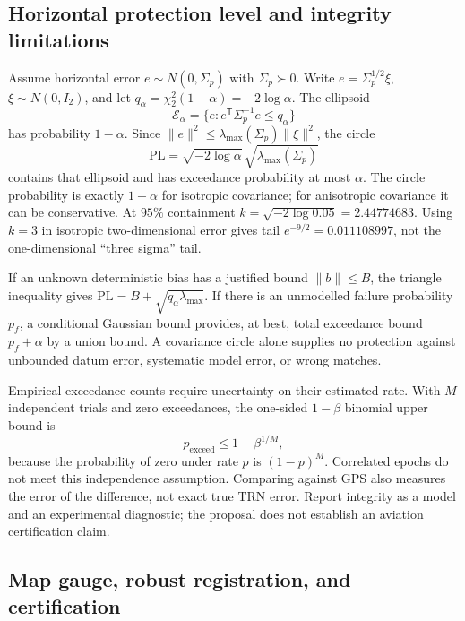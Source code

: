 \subsection{Horizontal protection level and integrity limitations}

Assume horizontal error $e\sim N(0,\Sigma_p)$ with
$\Sigma_p\succ0$. Write $e=\Sigma_p^{1/2}\xi$,
$\xi\sim N(0,I_2)$, and let
$q_\alpha=\chi_2^2(1-\alpha)=-2\log\alpha$.
The ellipsoid
\begin{equation}
 \mathcal E_\alpha=\{e:e^{\mathsf T}\Sigma_p^{-1}e\leq q_\alpha\}
\end{equation}
has probability $1-\alpha$. Since
$\|e\|^2\leq\lambda_{\max}(\Sigma_p)\|\xi\|^2$, the circle
\begin{equation}
 \mathrm{PL}=\sqrt{-2\log\alpha}\,
                          \sqrt{\lambda_{\max}(\Sigma_p)}
 \label{eq:PL-proof}
\end{equation}
contains that ellipsoid and has exceedance probability at most
$\alpha$. The circle probability is exactly $1-\alpha$ for isotropic
covariance; for anisotropic covariance it can be conservative.
At $95\%$ containment $k=\sqrt{-2\log0.05}=2.44774683$.
Using $k=3$ in isotropic two-dimensional error gives tail
$e^{-9/2}=0.011108997$, not the one-dimensional ``three sigma'' tail.

If an unknown deterministic bias has a justified bound $\|b\|\leq B$,
the triangle inequality gives $\mathrm{PL}=B+
\sqrt{q_\alpha\lambda_{\max}}$. If there is an unmodelled failure
probability $p_f$, a conditional Gaussian bound provides, at best,
total exceedance bound $p_f+\alpha$ by a union bound. A covariance
circle alone supplies no protection against unbounded datum error,
systematic model error, or wrong matches.

Empirical exceedance counts require uncertainty on their estimated
rate. With $M$ independent trials and zero exceedances, the one-sided
$1-\beta$ binomial upper bound is
\begin{equation}
 p_{\mathrm{exceed}}\leq1-\beta^{1/M},
\end{equation}
because the probability of zero under rate $p$ is $(1-p)^M$. Correlated
epochs do not meet this independence assumption. Comparing against GPS
also measures the error of the difference, not exact true TRN error.
Report integrity as a model and an experimental diagnostic; the
proposal does not establish an aviation certification claim.

\subsection{Map gauge, robust registration, and certification}

